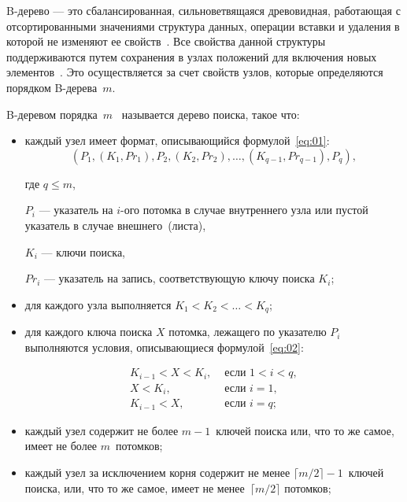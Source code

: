 B-дерево --- это сбалансированная, сильноветвящаяся древовидная,
работающая с отсортированными значениями структура данных, операции вставки и
удаления в которой не изменяют ее свойств~\cite{loshad}. Все свойства данной
структуры поддерживаются путем сохранения в узлах положений для включения новых
элементов~\cite{baw}. Это осуществляется за счет свойств узлов, которые
определяются порядком B-дерева~$m$.

B-деревом порядка~$m$~\cite{baw, arki} называется дерево поиска, такое
что:

\begin{itemize}
    \item каждый узел имеет формат, описывающийся формулой~\eqref{eq:01}:
        \begin{equation}\label{eq:01}
            (P_1, (K_1, Pr_1), P_2, (K_2, Pr_2), \dots, (K_{q-1}, Pr_{q-1}),
            P_q),
        \end{equation}

        где $q \leqslant m$,

        $P_i$ --- указатель на $i$-ого потомка в случае внутреннего узла или
        пустой указатель в случае внешнего~(листа),

        $K_i$ --- ключи поиска,

        $Pr_i$ --- указатель на запись, соответствующую ключу поиска $K_i$;

    \item для каждого узла выполняется $K_1 < K_2 < \dots < K_q$;

    \item для каждого ключа поиска $X$ потомка, лежащего по указателю $P_i$
        выполняются условия, описывающиеся формулой~\eqref{eq:02}:

        \begin{equation}\label{eq:02}
            \begin{aligned}
                K_{i-1} < X < K_i, & \text{ если } 1 < i < q,\\
                X < K_i, & \text{ если } i = 1,\\
                K_{i-1} < X, & \text{ если } i = q;
            \end{aligned}
        \end{equation}

    \item каждый узел содержит не более $m - 1$~ключей поиска или, что то же
        самое, имеет не более $m$~потомков;

    \item каждый узел за исключением корня содержит не менее $\lceil m / 2
        \rceil - 1$~ключей поиска, или, что то же самое, имеет не менее~$\lceil
        m / 2 \rceil$ потомков;


\end{itemize}
